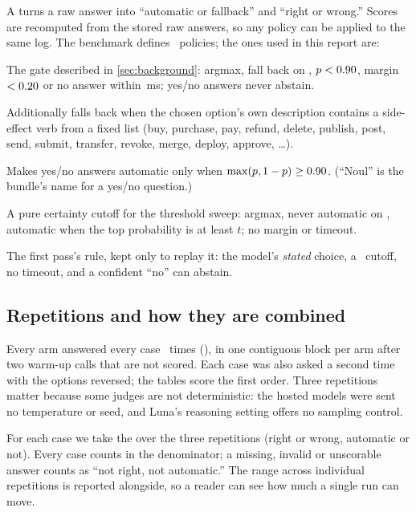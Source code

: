 A  turns a raw answer into ``automatic or fallback'' and ``right or wrong.'' Scores are
recomputed from the stored raw answers, so any policy can be applied to the same log. The benchmark
defines \NumPolicies\ policies; the ones used in this report are:
\begin{description}[leftmargin=1.2em,style=nextline]
  \item[\code{bundle-read-shortcut} (primary)] The gate described in \cref{sec:background}: argmax, fall
    back on , $p<0.90$, margin $<0.20$ or no answer within \TimeoutMs\,ms; yes/no
    answers never abstain.
  \item[\code{+host-guard} (intervention I2)] Additionally falls back when the chosen option's own
    description contains a side-effect verb from a fixed list (buy, purchase, pay, refund, delete,
    publish, post, send, submit, transfer, revoke, merge, deploy, approve, \dots).
  \item[\code{+noul-gate} (intervention I3)] Makes yes/no answers automatic only when
    $\max(p, 1-p) \ge 0.90$. (``Noul'' is the bundle's name for a yes/no question.)
  \item[\code{cutoff-$t$}] A pure certainty cutoff for the threshold sweep: argmax, never automatic on
    , automatic when the top probability is at least $t$; no margin or timeout.
  \item[\code{study-0.75}] The first pass's rule, kept only to replay it: the model's \emph{stated}
    choice, a \StudyCutoff\ cutoff, no timeout, and a confident ``no'' can abstain.
\end{description}

\subsection{Repetitions and how they are combined}

Every arm answered every case \DevReps\ times (), in one contiguous block per arm after
two warm-up calls that are not scored. Each case was also asked a second time with the options reversed;
the tables score the first order. Three repetitions matter because some judges are not deterministic:
the hosted models were sent no temperature or seed, and Luna's reasoning setting offers no sampling
control.

\begin{keyidea}
For each case we take the  over the three repetitions (right or wrong,
automatic or not). Every case counts in the denominator; a missing, invalid or unscorable answer counts
as ``not right, not automatic.'' The range across individual repetitions is reported alongside, so a
reader can see how much a single run can move.
\end{keyidea}

